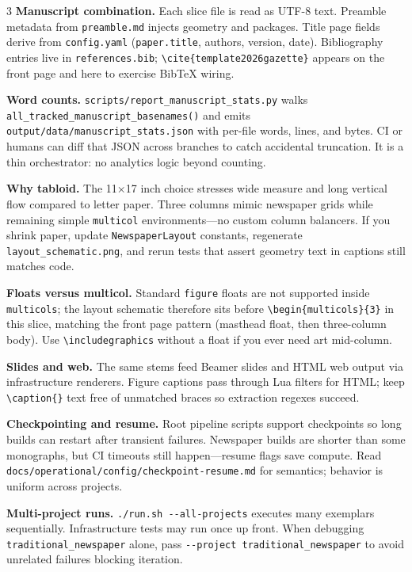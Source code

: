 \documentclass[
]{article}
\begin{document}
\begin{multicols}{3}
\textbf{Manuscript combination.} Each slice file is read as UTF-8 text.
Preamble metadata from \texttt{preamble.md} injects geometry and
packages. Title page fields derive from \texttt{config.yaml}
(\texttt{paper.title}, authors, version, date). Bibliography entries
live in \texttt{references.bib};
\texttt{\textbackslash{}cite\{template2026gazette\}} appears on the
front page and here to exercise BibTeX wiring.

\textbf{Word counts.} \texttt{scripts/report\_manuscript\_stats.py}
walks \texttt{all\_tracked\_manuscript\_basenames()} and emits
\texttt{output/data/manuscript\_stats.json} with per-file words, lines,
and bytes. CI or humans can diff that JSON across branches to catch
accidental truncation. It is a thin orchestrator: no analytics logic
beyond counting.

\textbf{Why tabloid.} The 11×17 inch choice stresses wide measure and
long vertical flow compared to letter paper. Three columns mimic
newspaper grids while remaining simple \texttt{multicol}
environments---no custom column balancers. If you shrink paper, update
\texttt{NewspaperLayout} constants, regenerate
\texttt{layout\_schematic.png}, and rerun tests that assert geometry
text in captions still matches code.

\textbf{Floats versus multicol.} Standard \texttt{figure} floats are not
supported inside \texttt{multicols}; the layout schematic therefore sits
before \texttt{\textbackslash{}begin\{multicols\}\{3\}} in this slice,
matching the front page pattern (masthead float, then three-column
body). Use \texttt{\textbackslash{}includegraphics} without a float if
you ever need art mid-column.

\textbf{Slides and web.} The same stems feed Beamer slides and HTML web
output via infrastructure renderers. Figure captions pass through Lua
filters for HTML; keep \texttt{\textbackslash{}caption\{\}} text free of
unmatched braces so extraction regexes succeed.

\textbf{Checkpointing and resume.} Root pipeline scripts support
checkpoints so long builds can restart after transient failures.
Newspaper builds are shorter than some monographs, but CI timeouts still
happen---resume flags save compute. Read
\texttt{docs/operational/config/checkpoint-resume.md} for semantics;
behavior is uniform across projects.

\textbf{Multi-project runs.} \texttt{./run.sh\ -\/-all-projects}
executes many exemplars sequentially. Infrastructure tests may run once
up front. When debugging \texttt{traditional\_newspaper} alone, pass
\texttt{-\/-project\ traditional\_newspaper} to avoid unrelated failures
blocking iteration.


\end{multicols}
\end{document}
